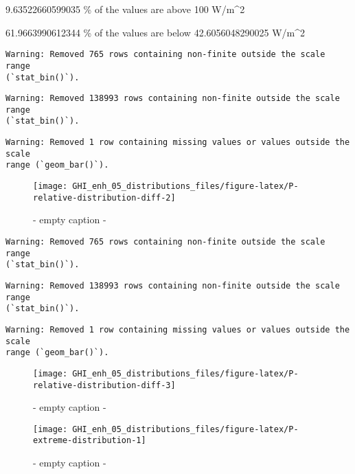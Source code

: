 \documentclass[
  10pt,
  a4paper,oneside]{article}
\begin{document}
9.63522660599035 \% of the values are above 100 W/m\^{}2

61.9663990612344 \% of the values are below 42.6056048290025 W/m\^{}2

\begin{verbatim}
Warning: Removed 765 rows containing non-finite outside the scale range
(`stat_bin()`).
\end{verbatim}

\begin{verbatim}
Warning: Removed 138993 rows containing non-finite outside the scale range
(`stat_bin()`).
\end{verbatim}

\begin{verbatim}
Warning: Removed 1 row containing missing values or values outside the scale
range (`geom_bar()`).
\end{verbatim}

\begin{figure}[H]

{\centering \texttt{[image: GHI\_enh\_05\_distributions\_files/figure-latex/P-relative-distribution-diff-2]} 

}

\caption{ - empty caption - }\label{fig:P-relative-distribution-diff-2}
\end{figure}

\begin{verbatim}
Warning: Removed 765 rows containing non-finite outside the scale range
(`stat_bin()`).
\end{verbatim}

\begin{verbatim}
Warning: Removed 138993 rows containing non-finite outside the scale range
(`stat_bin()`).
\end{verbatim}

\begin{verbatim}
Warning: Removed 1 row containing missing values or values outside the scale
range (`geom_bar()`).
\end{verbatim}

\begin{figure}[H]

{\centering \texttt{[image: GHI\_enh\_05\_distributions\_files/figure-latex/P-relative-distribution-diff-3]} 

}

\caption{ - empty caption - }\label{fig:P-relative-distribution-diff-3}
\end{figure}
\begin{figure}[H]

{\centering \texttt{[image: GHI\_enh\_05\_distributions\_files/figure-latex/P-extreme-distribution-1]} 

}

\caption{ - empty caption - }\label{fig:P-extreme-distribution-1}
\end{figure}
\end{document}
